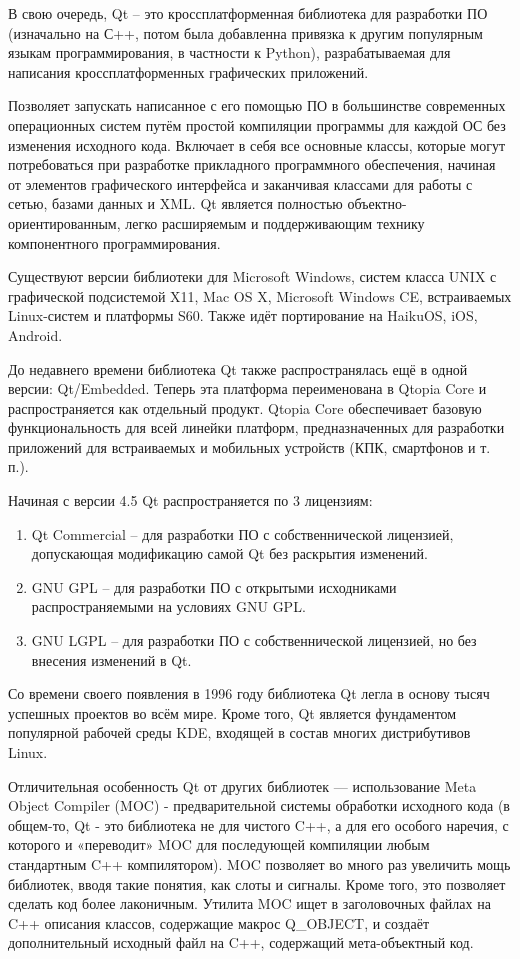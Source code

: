 В свою очередь, Qt -- это кроссплатформенная библиотека для разработки ПО (изначально на С++, потом была добавленна
привязка к другим популярным языкам программирования, в частности к Python), 
разрабатываемая для написания кроссплатформенных графических приложений.

Позволяет запускать написанное с его помощью ПО в большинстве современных 
операционных систем путём простой компиляции программы для каждой ОС без 
изменения исходного кода. Включает в себя все основные классы, которые могут 
потребоваться при разработке прикладного программного обеспечения, начиная от 
элементов графического интерфейса и заканчивая классами для работы с сетью, 
базами данных и XML. Qt является полностью объектно-ориентированным, легко 
расширяемым и поддерживающим технику компонентного программирования.

Существуют версии библиотеки для Microsoft Windows, систем класса UNIX с 
графической подсистемой X11, Mac OS X, Microsoft Windows CE, встраиваемых 
Linux-систем и платформы S60. Также идёт портирование на HaikuOS, iOS, Android.

До недавнего времени библиотека Qt также распространялась ещё в одной версии: 
Qt/Embedded. Теперь эта платформа переименована в Qtopia Core и распространяется 
как отдельный продукт. Qtopia Core обеспечивает базовую функциональность для 
всей линейки платформ, предназначенных для разработки приложений для встраиваемых и 
мобильных устройств (КПК, смартфонов и т. п.).

Начиная с версии 4.5 Qt распространяется по 3 лицензиям:

\begin{enumerate}[label=--]
    \item Qt Commercial -- для разработки ПО с собственнической лицензией, 
          допускающая модификацию самой Qt без раскрытия изменений.
    \item GNU GPL -- для разработки ПО с открытыми исходниками распространяемыми 
          на условиях GNU GPL.
    \item GNU LGPL -- для разработки ПО с собственнической лицензией, но без 
          внесения изменений в Qt.
\end{enumerate}

Со времени своего появления в 1996 году библиотека Qt легла в основу тысяч 
успешных проектов во всём мире. Кроме того, Qt является фундаментом популярной 
рабочей среды KDE, входящей в состав многих дистрибутивов Linux.

Отличительная особенность Qt от других библиотек — использование
Meta Object Compiler (MOC) - предварительной системы обработки исходного кода
(в общем-то, Qt - это библиотека не для чистого C++, а для его особого наречия,
с которого и «переводит» MOC для последующей компиляции любым стандартным C++
компилятором). MOC позволяет во много раз увеличить мощь библиотек, вводя такие
понятия, как слоты и сигналы. Кроме того, это позволяет сделать код более
лаконичным. Утилита MOC ищет в заголовочных файлах на C++ описания классов,
содержащие макрос Q\_OBJECT, и создаёт дополнительный исходный файл на C++,
содержащий мета-объектный код.

